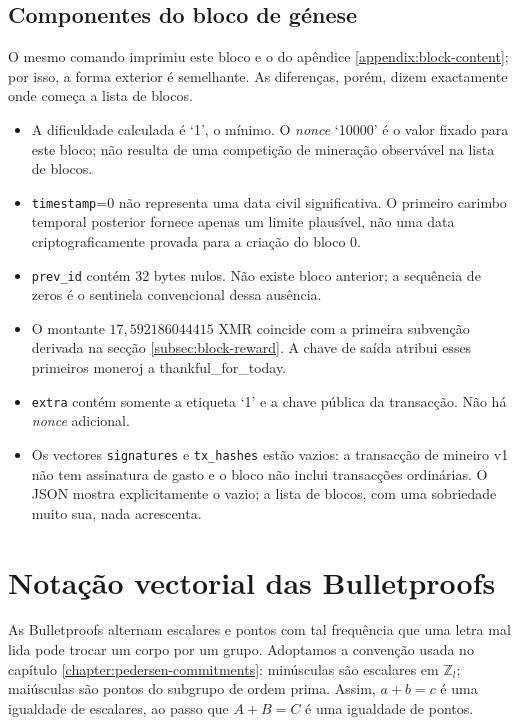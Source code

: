 \begin{appendices}
\section*{Componentes do bloco de génese}

O mesmo comando imprimiu este bloco e o do apêndice
\ref{appendix:block-content}; por isso, a forma exterior é semelhante. As
diferenças, porém, dizem exactamente onde começa a lista de blocos.

\begin{itemize}
 \item A dificuldade calculada é `1', o mínimo. O \emph{nonce} `10000' é o
 valor fixado para este bloco; não resulta de uma competição de mineração
 observável na lista de blocos.

 \item {\tt timestamp}=0 não representa uma data civil significativa. O
 primeiro carimbo temporal posterior fornece apenas um limite plausível, não
 uma data criptograficamente provada para a criação do bloco 0.

 \item {\tt prev\_id} contém 32 bytes nulos. Não existe bloco anterior; a
 sequência de zeros é o sentinela convencional dessa ausência.

 \item O montante \(17{,}592186044415\) XMR coincide com a primeira subvenção
 derivada na secção \ref{subsec:block-reward}. A chave de saída atribui esses
 primeiros moneroj a thankful\_for\_today.

 \item {\tt extra} contém somente a etiqueta `1' e a chave pública da
 transacção. Não há \emph{nonce} adicional.

 \item Os vectores {\tt signatures} e {\tt tx\_hashes} estão vazios: a
 transacção de mineiro v1 não tem assinatura de gasto e o bloco não inclui
 transacções ordinárias. O JSON mostra explicitamente o vazio; a lista de blocos, com
 uma sobriedade muito sua, nada acrescenta.
\end{itemize}

\chapter{Notação vectorial das Bulletproofs}
\label{appendix:nota}

As Bulletproofs alternam escalares e pontos com tal frequência que uma letra
mal lida pode trocar um corpo por um grupo. Adoptamos a convenção usada no
capítulo \ref{chapter:pedersen-commitments}: minúsculas são escalares em
\(\mathbb Z_l\); maiúsculas são pontos do subgrupo de ordem prima. Assim,
\(a+b=c\) é uma igualdade de escalares, ao passo que \(A+B=C\) é uma
igualdade de pontos.


\end{appendices}
